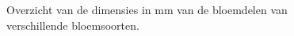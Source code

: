 \begin{figure}
    \begin{extrawijd}
        \caption{Overzicht van de dimensies in mm van de bloemdelen van verschillende bloemsoorten.}
        \label{tab:iris_data}

    \end{extrawijd}
\end{figure}
